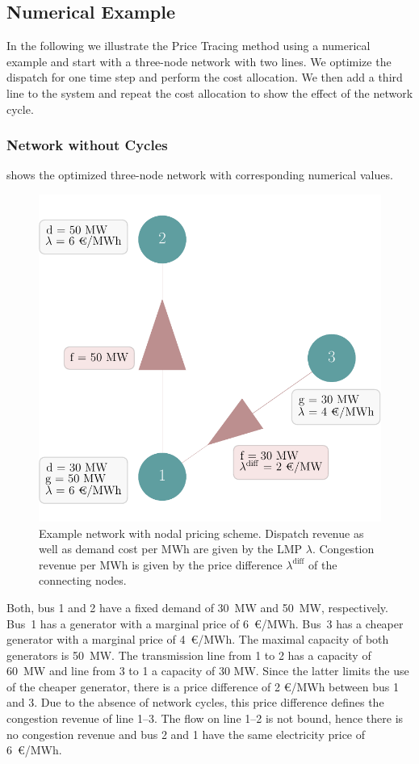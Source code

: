 \documentclass[11pt,twocolumn]{article}
\begin{document}
\subsection{Numerical Example}
\label{sec:numerical_example}

In the following we illustrate the Price Tracing method using a numerical example and start with a three-node network with two lines. We optimize the dispatch for one time step and perform the cost allocation. We then add a third line to the system and repeat the cost allocation to show the effect of the network cycle.      


\subsubsection*{Network without Cycles}
 shows the optimized three-node network with corresponding numerical values.
\begin{figure}[h!]
    \includegraphics[width=\linewidth]{example-without-cycles/network}
    \caption{Example network with nodal pricing scheme. Dispatch revenue as well as demand cost per MWh are given by the \ac{LMP} $\lambda$. Congestion revenue per MWh is given by the price difference $\lambda^\text{diff}$ of the connecting nodes.}
    \label{fig:example-network-wo}
\end{figure}
Both, bus 1 and 2 have a fixed demand of 30~MW and 50~MW, respectively. Bus~1 has a generator with a marginal price of 6~\euro/MWh. Bus~3 has a cheaper generator with a marginal price of 4~\euro/MWh. The maximal capacity of both generators is 50~MW. The transmission line from 1 to 2 has a capacity of 60~MW and line from 3 to 1 a capacity of 30 MW. Since the latter limits the use of the cheaper generator, there is a price difference of 2 \euro/MWh between bus 1 and 3. Due to the absence of network cycles, this price difference defines the congestion revenue of line 1--3. The flow on line 1--2 is not bound, hence there is no congestion revenue and bus 2 and 1 have the same electricity price of 6~\euro/MWh.  
\end{document}
